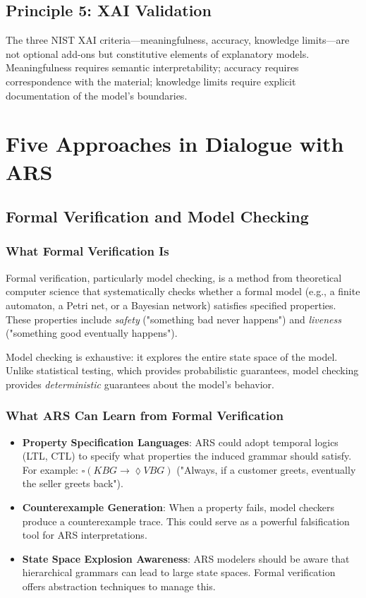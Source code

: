 \documentclass[12pt,a4paper]{article}
\begin{document}
\subsection{Principle 5: XAI Validation}

The three NIST XAI criteria—meaningfulness, accuracy, knowledge limits—are 
not optional add-ons but constitutive elements of explanatory models. 
Meaningfulness requires semantic interpretability; accuracy requires 
correspondence with the material; knowledge limits require explicit 
documentation of the model's boundaries.

\section{Five Approaches in Dialogue with ARS}

\subsection{Formal Verification and Model Checking}

\subsubsection{What Formal Verification Is}

Formal verification, particularly model checking, is a method from theoretical 
computer science that systematically checks whether a formal model (e.g., a 
finite automaton, a Petri net, or a Bayesian network) satisfies specified 
properties. These properties include \textit{safety} ("something bad never 
happens") and \textit{liveness} ("something good eventually happens").

Model checking is exhaustive: it explores the entire state space of the model.
Unlike statistical testing, which provides probabilistic guarantees, model 
checking provides \textit{deterministic} guarantees about the model's behavior.

\subsubsection{What ARS Can Learn from Formal Verification}

\begin{itemize}
    \item \textbf{Property Specification Languages}: ARS could adopt temporal 
    logics (LTL, CTL) to specify what properties the induced grammar should 
    satisfy. For example: $\square (KBG \rightarrow \lozenge VBG)$ ("Always, 
    if a customer greets, eventually the seller greets back").
    
    \item \textbf{Counterexample Generation}: When a property fails, model 
    checkers produce a counterexample trace. This could serve as a powerful 
    falsification tool for ARS interpretations.
    
    \item \textbf{State Space Explosion Awareness}: ARS modelers should be 
    aware that hierarchical grammars can lead to large state spaces. Formal 
    verification offers abstraction techniques to manage this.
\end{itemize}
\end{document}
